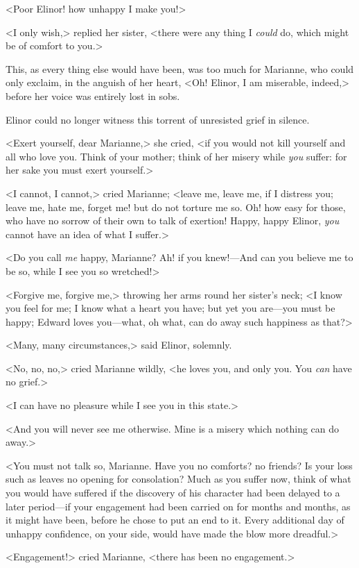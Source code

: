 <Poor Elinor! how unhappy I make you!>

<I only wish,> replied her sister, <there were any thing I \textit{could} do, which might be of comfort to you.>

This, as every thing else would have been, was too much for Marianne, who could only exclaim, in the anguish of her heart, <Oh! Elinor, I am miserable, indeed,> before her voice was entirely lost in sobs.

Elinor could no longer witness this torrent of unresisted grief in silence.

<Exert yourself, dear Marianne,> she cried, <if you would not kill yourself and all who love you. Think of your mother; think of her misery while \textit{you} suffer: for her sake you must exert yourself.>

<I cannot, I cannot,> cried Marianne; <leave me, leave me, if I distress you; leave me, hate me, forget me! but do not torture me so. Oh! how easy for those, who have no sorrow of their own to talk of exertion! Happy, happy Elinor, \textit{you} cannot have an idea of what I suffer.>

<Do you call \textit{me} happy, Marianne? Ah! if you knew!—And can you believe me to be so, while I see you so wretched!>

<Forgive me, forgive me,> throwing her arms round her sister's neck; <I know you feel for me; I know what a heart you have; but yet you are—you must be happy; Edward loves you—what, oh what, can do away such happiness as that?>

<Many, many circumstances,> said Elinor, solemnly.

<No, no, no,> cried Marianne wildly, <he loves you, and only you. You \textit{can} have no grief.>

<I can have no pleasure while I see you in this state.>

<And you will never see me otherwise. Mine is a misery which nothing can do away.>

<You must not talk so, Marianne. Have you no comforts? no friends? Is your loss such as leaves no opening for consolation? Much as you suffer now, think of what you would have suffered if the discovery of his character had been delayed to a later period—if your engagement had been carried on for months and months, as it might have been, before he chose to put an end to it. Every additional day of unhappy confidence, on your side, would have made the blow more dreadful.>

<Engagement!> cried Marianne, <there has been no engagement.>

